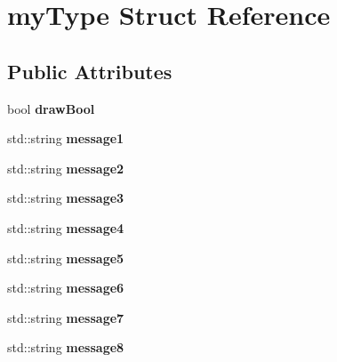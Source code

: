 \hypertarget{structmy_type}{
\section{myType Struct Reference}
\label{structmy_type}
}
\subsection*{Public Attributes}
\begin{DoxyCompactItemize}
\item 
\hypertarget{structmy_type_a1806e1b3feba23cbf99abb0ee121faff}{
bool {\bfseries drawBool}}
\label{structmy_type_a1806e1b3feba23cbf99abb0ee121faff}

\item 
\hypertarget{structmy_type_a7760e617f9639c1ed8aee0566664350c}{
std::string {\bfseries message1}}
\label{structmy_type_a7760e617f9639c1ed8aee0566664350c}

\item 
\hypertarget{structmy_type_aba9036d65ba17d265bda6aa924052619}{
std::string {\bfseries message2}}
\label{structmy_type_aba9036d65ba17d265bda6aa924052619}

\item 
\hypertarget{structmy_type_ad5b48645a1dfb891b67869902f34c63f}{
std::string {\bfseries message3}}
\label{structmy_type_ad5b48645a1dfb891b67869902f34c63f}

\item 
\hypertarget{structmy_type_add5b99980fa6120d581d12094b4fe8ff}{
std::string {\bfseries message4}}
\label{structmy_type_add5b99980fa6120d581d12094b4fe8ff}

\item 
\hypertarget{structmy_type_a37502f96cb5cf75cfa68fc7dab1bb946}{
std::string {\bfseries message5}}
\label{structmy_type_a37502f96cb5cf75cfa68fc7dab1bb946}

\item 
\hypertarget{structmy_type_a9572ab212bf5c88ed0aee2125323e20b}{
std::string {\bfseries message6}}
\label{structmy_type_a9572ab212bf5c88ed0aee2125323e20b}

\item 
\hypertarget{structmy_type_a08666ded4049d39e8f4a3ecbf6a5fe15}{
std::string {\bfseries message7}}
\label{structmy_type_a08666ded4049d39e8f4a3ecbf6a5fe15}

\item 
\hypertarget{structmy_type_af5c4be1b717fed12053cbf66bc7d74a1}{
std::string {\bfseries message8}}
\label{structmy_type_af5c4be1b717fed12053cbf66bc7d74a1}


\end{DoxyCompactItemize}
